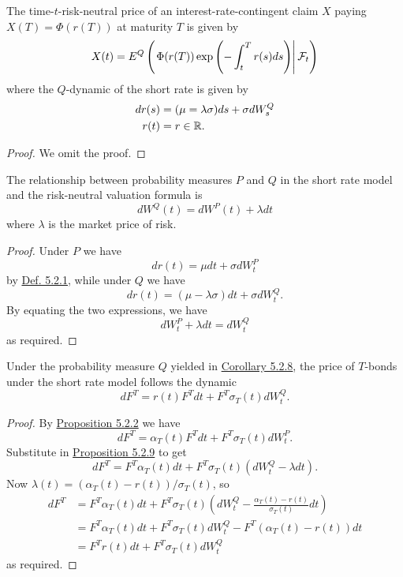 \documentclass[11pt,fleqn]{book} %
\begin{document}
\begin{corollary} \label{cor:528}
The time-\(t\)-risk-neutral price of an interest-rate-contingent claim \(X\) paying \(X(T) = \Phi(r(T))\) at maturity \(T\) is given by
\[
X(t) = E^Q\left(\left.\Phi(r(T))\exp\left(-\int_t^T r(s)ds\right)\right|\mathcal{F}_t\right)
\]
where the \(Q\)-dynamic of the short rate is given by
\[
\begin{aligned}
dr(s) &= (\mu = \lambda\sigma)ds + \sigma dW_s^Q \\
r(t) &= r \in \mathbb{R}.
\end{aligned}
\]
\end{corollary}
\begin{proof}
We omit the proof.
\end{proof}

\begin{proposition} \label{prop:529}
The relationship between probability measures \(P\) and \(Q\) in the short rate model and the risk-neutral valuation formula is
\[
dW^Q(t) = dW^P(t) + \lambda dt
\]
where \(\lambda\) is the market price of risk.
\end{proposition}
\begin{proof}
Under \(P\) we have
\[
dr(t) = \mu dt + \sigma dW_t^P
\]
by \hyperref[def:521]{Def. 5.2.1}, while under \(Q\) we have
\[
dr(t) = (\mu - \lambda\sigma)dt + \sigma dW_t^Q.
\]
\indent By equating the two expressions, we have
\[
dW_t^P + \lambda dt = dW_t^Q
\]
as required.
\end{proof}

\begin{corollary} \label{cor:5210}
Under the probability measure \(Q\) yielded in \hyperref[cor:528]{Corollary 5.2.8}, the price of \(T\)-bonds under the short rate model follows the dynamic
\[
dF^T = r(t)F^Tdt + F^T\sigma_T(t) dW_t^Q.
\]
\end{corollary}
\begin{proof}
By \hyperref[prop:522]{Proposition 5.2.2} we have
\[
dF^T = \alpha_T(t)F^Tdt + F^T\sigma_T(t)dW_t^P.
\]
\indent Substitute in \hyperref[prop:529]{Proposition 5.2.9} to get
\[
dF^T = F^T\alpha_T(t)dt + F^T\sigma_T(t)(dW_t^Q - \lambda dt).
\]
\indent Now \(\lambda(t) = (\alpha_T(t) - r(t)) / \sigma_T(t)\), so
\[
\begin{aligned}
dF^T &= F^T\alpha_T(t)dt + F^T\sigma_T(t)\left(dW_t^Q - \frac{\alpha_T(t) - r(t)}{\sigma_T(t)}dt\right) \\
&= F^T\alpha_T(t)dt + F^T\sigma_T(t)dW_t^Q - F^T(\alpha_T(t) - r(t))dt \\
&= F^Tr(t)dt + F^T\sigma_T(t)dW_t^Q
\end{aligned}
\]
as required.
\end{proof}
\end{document}
